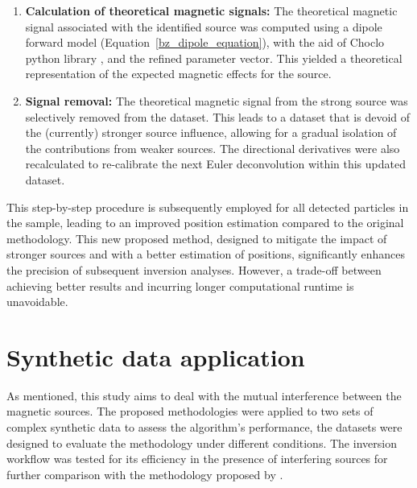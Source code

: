 \begin{enumerate}
    \item \textbf{Calculation of theoretical magnetic signals:} The theoretical magnetic signal associated with the identified source was computed using a dipole forward model (Equation~\ref{bz_dipole_equation}), with the aid of Choclo python library \citep{choclo2022}, and the refined parameter vector. This yielded a theoretical representation of the expected magnetic effects for the source.
    
    \item \textbf{Signal removal:} The theoretical magnetic signal from the strong source was selectively removed from the dataset. This leads to a dataset that is devoid of the (currently) stronger source influence, allowing for a gradual isolation of the contributions from weaker sources. The directional derivatives were also recalculated to re-calibrate the next Euler deconvolution within this updated dataset.
 
\end{enumerate}

This step-by-step procedure is subsequently employed for all detected particles in the sample, leading to an improved position estimation compared to the original methodology. This new proposed method, designed to mitigate the impact of stronger sources and with a better estimation of positions, significantly enhances the precision of subsequent inversion analyses. However, a trade-off between achieving better results and incurring longer computational runtime is unavoidable. 


\section{Synthetic data application}

As mentioned, this study aims to deal with the mutual interference between the magnetic sources. The proposed methodologies were applied to two sets of complex synthetic data to assess the algorithm's performance, the datasets were designed to evaluate the methodology under different conditions. The inversion workflow was tested for its efficiency in the presence of interfering sources for further comparison with the methodology proposed by  \citet{Souza-Junior2023b}.

